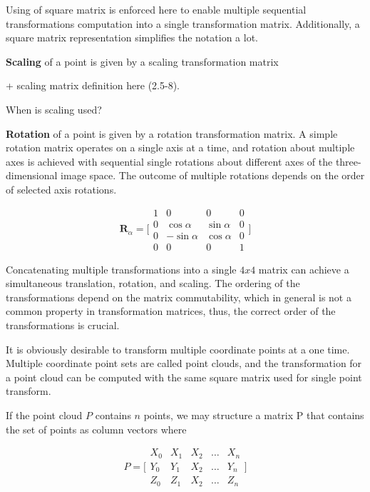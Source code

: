 \documentclass[12pt,a4paper,oneside,pdftex]{report}
\begin{document}
Using of square matrix is enforced here to enable multiple sequential transformations computation into a single transformation matrix. Additionally, a square matrix representation simplifies the notation a lot.

\textbf{Scaling} of a point is given by a scaling transformation matrix

+ scaling matrix definition here (2.5-8).

When is scaling used?

\textbf{Rotation} of a point is given by a rotation transformation matrix. A simple rotation matrix operates on a single axis at a time, and rotation about multiple axes is achieved with sequential single rotations about different axes of the three-dimensional image space. The outcome of multiple rotations depends on the order of selected axis rotations.

\begin{equation}
\textbf{R}_\alpha = \Biggl[ \begin{array}{cccc}
1 & 0 & 0 & 0 \\
0 & \cos \alpha & \sin \alpha & 0 \\
0 & -\sin \alpha & \cos \alpha & 0 \\
0 & 0 & 0 & 1 \end{array} \Biggl]
\end{equation}

Concatenating multiple transformations into a single $4 x 4$ matrix can achieve a simultaneous translation, rotation, and scaling. The ordering of the transformations depend on the matrix commutability, which in general is not a common property in transformation matrices, thus, the correct order of the transformations is crucial. 

It is obviously desirable to transform multiple coordinate points at a one time. Multiple coordinate point sets are called point clouds, and the transformation for a point cloud can be computed with the same square matrix used for single point transform.

If the point cloud $P$ contains $n$ points, we may structure a matrix P that contains the set of points as column vectors where

\begin{equation}
P = \Biggl[ \begin{array}{ccccc}
X_0 & X_1 & X_2 & \dots & X_n \\
Y_0 & Y_1 & X_2 & \dots & Y_n \\
Z_0 & Z_1 & X_2 & \dots & Z_n \end{array} \Biggl]
\end{equation}
\end{document}
